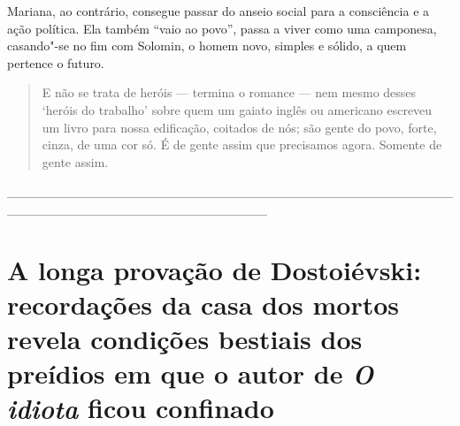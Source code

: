 Mariana, ao contrário, consegue passar do anseio social para a
consciência e a ação política. Ela também ``vaio ao povo'', passa a
viver como uma camponesa, casando"-se no fim com Solomin, o homem novo,
simples e sólido, a quem pertence o futuro.

\begin{quote}
E não se trata de heróis --- termina o romance --- nem mesmo desses
`heróis do trabalho' sobre quem um gaiato inglês ou americano escreveu
um livro para nossa edificação, coitados de nós; são gente do povo,
forte, cinza, de uma cor só. É de gente assim que precisamos agora.
Somente de gente assim.
\end{quote}

\_\_\_\_\_\_\_\_\_\_\_\_\_\_\_\_\_\_\_\_\_\_\_\_\_\_\_\_\_\_\_\_\_\_\_\_\_\_\_\_\_\_\_\_\_\_\_\_\_\_\_\_\_\_\_\_\_\_\_\_\_\_\_\_\_\_\_\_\_\_\_\_\_\_\_\_

\chapter{A longa provação de Dostoiévski: recordações da casa dos mortos revela condições bestiais dos preídios em que o autor de \emph{O
idiota} ficou confinado}

